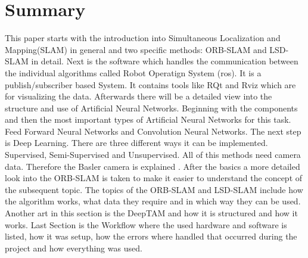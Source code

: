 

\chapter*{Summary}

This paper starts with the introduction into Simultaneous Localization and Mapping(SLAM) in general and two specific methods: ORB-SLAM and LSD-SLAM in detail. \newline
Next is the software which handles the communication between the individual algorithms called Robot Operatign System (\gls{ros}). It is a publish/subscriber based System. It contains tools like RQt and Rviz which are for visualizing the data. Afterwards there will be a detailed view into the structure and use of Artificial Neural Networks. Beginning with the components and then the most important types of Artificial Neural Networks for this task. Feed Forward Neural Networks and Convolution Neural Networks. The next step is Deep Learning. There are three different ways it can be implemented. Supervised, Semi-Supervised and Unsupervised. All of this methods need camera data. Therefore the Basler camera is explained . \newline
After the basics a more detailed look into the ORB-SLAM is taken to make it easier to understand the concept of the subsequent topic. The topics of the ORB-SLAM and LSD-SLAM include how the algorithm works, what data they require and in which way they can be used. Another art in this section is the DeepTAM and how it is structured and how it works. \newline
Last Section is the Workflow where the used hardware and software is listed, how it was setup, how the errors where handled that occurred during the project and how everything was used.